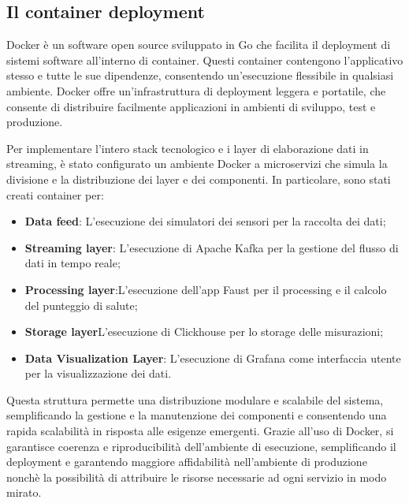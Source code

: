 \subsection{Il container deployment}
Docker è un software open source sviluppato in Go che facilita il deployment di sistemi software all'interno di container. Questi container contengono l'applicativo stesso e tutte le sue dipendenze, consentendo un'esecuzione flessibile in qualsiasi ambiente. Docker offre un'infrastruttura di deployment leggera e portatile, che consente di distribuire facilmente applicazioni in ambienti di sviluppo, test e produzione.

Per implementare l'intero stack tecnologico e i layer di elaborazione dati in streaming, è stato configurato un ambiente Docker a microservizi che simula la divisione e la distribuzione dei layer e dei componenti. In particolare, sono stati creati container per:
\begin{itemize}
    \item \textbf{Data feed}: L'esecuzione dei simulatori dei sensori per la raccolta dei dati;
    \item \textbf{Streaming layer}: L'esecuzione di Apache Kafka per la gestione del flusso di dati in tempo reale;
    \item \textbf{Processing layer}:L'esecuzione dell'app Faust per il processing e il calcolo del punteggio di salute;
    \item \textbf{Storage layer}L'esecuzione di Clickhouse per lo storage delle misurazioni;
    \item \textbf{Data Visualization Layer}: L'esecuzione di Grafana come interfaccia utente per la visualizzazione dei dati.
\end{itemize}
Questa struttura permette una distribuzione modulare e scalabile del sistema, semplificando la gestione e la manutenzione dei componenti e consentendo una rapida scalabilità in risposta alle esigenze emergenti. Grazie all'uso di Docker, si garantisce coerenza e riproducibilità dell'ambiente di esecuzione, semplificando il deployment e garantendo maggiore affidabilità nell'ambiente di produzione nonchè la possibilità di attribuire le risorse necessarie ad ogni servizio in modo mirato.


